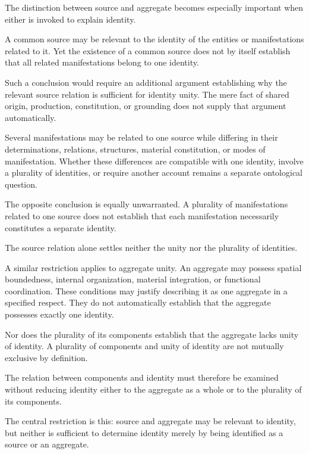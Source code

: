 The distinction between source and aggregate
becomes especially important when either
is invoked to explain identity.

A common source may be relevant to the
identity of the entities or manifestations
related to it. Yet the existence of a common
source does not by itself establish that
all related manifestations belong to one
identity.

Such a conclusion would require an additional
argument establishing why the relevant
source relation is sufficient for identity
unity. The mere fact of shared origin,
production, constitution, or grounding
does not supply that argument automatically.

Several manifestations may be related to
one source while differing in their
determinations, relations, structures,
material constitution, or modes of
manifestation. Whether these differences
are compatible with one identity, involve
a plurality of identities, or require
another account remains a separate
ontological question.

The opposite conclusion is equally
unwarranted. A plurality of manifestations
related to one source does not establish
that each manifestation necessarily
constitutes a separate identity.

The source relation alone settles neither
the unity nor the plurality of identities.

A similar restriction applies to aggregate
unity. An aggregate may possess spatial
boundedness, internal organization,
material integration, or functional
coordination. These conditions may
justify describing it as one aggregate
in a specified respect. They do not
automatically establish that the aggregate
possesses exactly one identity.

Nor does the plurality of its components
establish that the aggregate lacks unity
of identity. A plurality of components
and unity of identity are not mutually
exclusive by definition.

The relation between components and
identity must therefore be examined
without reducing identity either to
the aggregate as a whole or to the
plurality of its components.

The central restriction is this:
source and aggregate may be relevant
to identity, but neither is sufficient
to determine identity merely by being
identified as a source or an aggregate.



